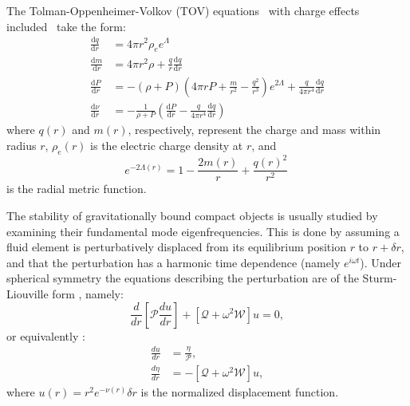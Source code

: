 \documentclass[12pt,noshowpacs,nofootinbib,notitlepage,amsmath,superscriptaddress]{revtex4-1}%
\begin{document}
 

The Tolman-Oppenheimer-Volkov (TOV) equations~\cite{Oppenheimer:1939ne,Tolman:1939jz} with charge effects included~\cite{Ray:2003gt} take the form:
\begin{align}
  \frac{\mathrm{d}q}{\mathrm{d}r} & {} = 4\pi r^2 \rho_e e^{\Lambda} \, \label{eq:TOV1} \\
  \frac{\mathrm{d}m}{\mathrm{d}r} & {} = 4\pi r^2 \rho  + \frac{q}{r}\frac{\mathrm{d}q}{\mathrm{d}r} \,  \label{eq:TOV2} \\
  \frac{\mathrm{d}P}{\mathrm{d}r} & {} = -(\rho + P)\left(4\pi r P + \frac{m}{r^2} - \frac{q^2}{r^3}\right)e^{2\Lambda}  
  + \frac{q}{4\pi r^4}\frac{\mathrm{d}q}{\mathrm{d}r}   \label{eq:TOV3} \\
   \frac{\mathrm{d}\nu}{\mathrm{d}r}  & {} = -\frac{1}{\rho + P}\left(\frac{\mathrm{d}P}{\mathrm{d}r} - \frac{q}{4\pi r^4}\frac{\mathrm{d}q}{\mathrm{d}r}\right) \, \label{eq:TOV4}
  \end{align}
where $q(r)$ and $m(r)$,  respectively, represent the charge and mass within radius $r$, $\rho_e(r)$ is the electric charge density at $r$, and
\begin{equation}
  \label{chargedTOV}
  e^{-2\Lambda(r)} = 1 - \frac{2m(r)}{r} + \frac{q(r)^2}{r^2}\,
\end{equation}
is the radial metric function.

The stability of gravitationally bound compact objects is usually studied by examining their fundamental mode eigenfrequencies. This is done by assuming a fluid element is perturbatively  displaced from its equilibrium position $r$ to $r + \delta r$, and that the perturbation has a harmonic time dependence (namely $e^{i\omega t}$). Under spherical symmetry the equations describing the perturbation are of the Sturm-Liouville form \cite{Brillante:2014lwa}, namely:
\begin{equation}\label{SLform}
\frac{d}{d r}\left[\mathcal{P} \frac{d u}{d r}\right]+\left[\mathcal{Q}+\omega^2 \mathcal{W}\right] u=0,
\end{equation}
or equivalently \cite{zhang:2021}:
\begin{equation}
    \begin{aligned}
        \frac{d u}{dr}&=\frac{\eta}{\mathcal{P}}, \\
        \frac{d \eta}{d r}&=-\left[\mathcal{Q}+\omega^2 \mathcal{W}\right] u,
    \end{aligned}
\end{equation}
where $u(r)=r^2e^{-\nu(r)} \delta r$ is the normalized displacement function. %
\end{document}
